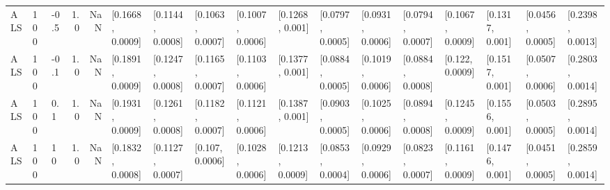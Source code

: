 \begin{tabular}{lllrrllllllllllll}
       ALS &  100 &  -0.5 &   1.0 &   NaN &  [0.1668, 0.0009] &  [0.1144, 0.0008] &  [0.1063, 0.0007] &  [0.1007, 0.0006] &   [0.1268, 0.001] &  [0.0797, 0.0005] &  [0.0931, 0.0006] &  [0.0794, 0.0007] &  [0.1067, 0.0009] &   [0.1317, 0.001] &  [0.0456, 0.0005] &  [0.2398, 0.0013] \\
       ALS &  100 &  -0.1 &   1.0 &   NaN &  [0.1891, 0.0009] &  [0.1247, 0.0008] &  [0.1165, 0.0007] &  [0.1103, 0.0006] &   [0.1377, 0.001] &  [0.0884, 0.0005] &  [0.1019, 0.0006] &  [0.0884, 0.0008] &   [0.122, 0.0009] &   [0.1517, 0.001] &  [0.0507, 0.0006] &  [0.2803, 0.0014] \\
       ALS &  100 &   0.1 &   1.0 &   NaN &  [0.1931, 0.0009] &  [0.1261, 0.0008] &  [0.1182, 0.0007] &  [0.1121, 0.0006] &   [0.1387, 0.001] &  [0.0903, 0.0005] &  [0.1025, 0.0006] &  [0.0894, 0.0008] &  [0.1245, 0.0009] &   [0.1556, 0.001] &  [0.0503, 0.0005] &  [0.2895, 0.0014] \\
       ALS &  100 &    10 &   1.0 &   NaN &  [0.1832, 0.0008] &  [0.1127, 0.0007] &   [0.107, 0.0006] &  [0.1028, 0.0006] &  [0.1213, 0.0009] &  [0.0853, 0.0004] &  [0.0929, 0.0006] &  [0.0823, 0.0007] &  [0.1161, 0.0009] &   [0.1476, 0.001] &  [0.0451, 0.0005] &  [0.2859, 0.0014] \\
\bottomrule
\end{tabular}
